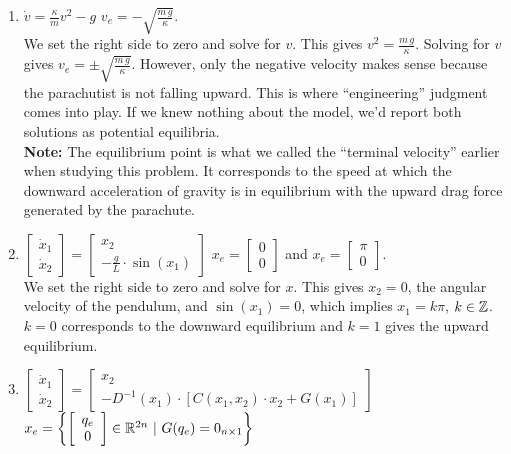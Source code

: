  \begin{enumerate}
\renewcommand{\labelenumi}{(\alph{enumi})}
\setlength{\itemsep}{.8cm}
    \item $\dot{v} =   \frac{\kappa}{m} v^2 - g$ \quad \Ans $v_e = -\sqrt{ \frac{m\,g}{\kappa} }.$ \\

We set the right side to zero and solve for $v$. This gives $v^2 =  \frac{m\,g}{\kappa}$. Solving for $v$ gives $v_e = \pm \sqrt{ \frac{m\,g}{\kappa} }$. However, only the negative velocity makes sense because the parachutist is not falling upward. This is where ``engineering'' judgment comes into play. If we knew nothing about the model, we'd report both solutions as potential equilibria.\\

\textbf{Note:} The equilibrium point is what we called the ``terminal velocity'' earlier when studying this problem. It corresponds to the speed at which the downward acceleration of gravity is in equilibrium with the upward drag force generated by the parachute.
    
    \item $\left[ \begin{array}{c} \dot{x}_1 \\ \dot{x}_2 \end{array} \right]= \left[\begin{array}{c} x_2 \\  -\frac{g}{L}  \cdot \sin(x_1)\end{array} \right]$ \quad \Ans $x_e = \left[ \begin{array}{c} 0\\ 0 \end{array} \right]$ and $x_e = \left[ \begin{array}{c} \pi \\ 0 \end{array} \right]$.\\

  We set the right side to zero and solve for $x$.  This gives $x_2=0$, the angular velocity of the pendulum, and $\sin(x_1) =0$, which implies $x_1 = k \pi$, $k \in \mathbb Z$. $k=0$ corresponds to the downward equilibrium and $k=1$ gives the upward equilibrium. 
    
    \item $ \left[ \begin{array}{c} \dot{x}_1 \\ \dot{x}_2 \end{array} \right] = \left[\begin{array}{c} x_2 \\-D^{-1}(x_1) \cdot \left[ C(x_1, x_2) \cdot x_2 + G(x_1)\right] \end{array} \right] $ \quad \Ans  $x_e = \left\{ \left[ \begin{array}{c} q_e\\ 0 \end{array} \right] \in \mathbb R^{2n}~|~ G(q_e) = 0_{n \times 1} \right\}$ \\


\end{enumerate}
